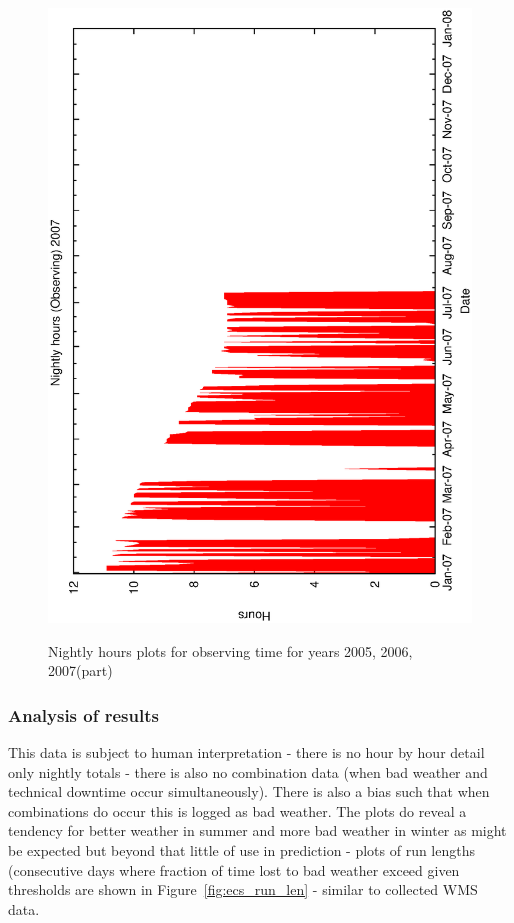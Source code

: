 {{\begin{figure}[htbp]
\begin{center}
{    \includegraphics[scale=0.4, angle=-90]{figures/ecs/met_nightly_stats_obs2007.eps}
  } 
\end{center}
\label{fig:met_nightly_obs}
\caption{Nightly hours plots for observing time for years 2005, 2006, 2007(part)}
\end{figure}



\subsubsection{Analysis of results}


This data is subject to human interpretation - there is no hour by hour detail only nightly totals - there is also no combination data (when bad weather and technical downtime occur simultaneously). There is also a bias such that when combinations do occur this is logged as bad weather. The plots do reveal a tendency for better weather in summer and more bad weather in winter as might be expected but beyond that little of use in prediction - plots of run lengths (consecutive days where fraction of time lost to bad weather exceed given thresholds are shown in Figure~\ref{fig:ecs_run_len}  - similar to collected WMS data. 

}}
